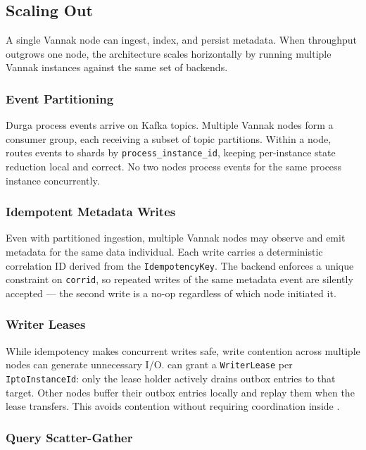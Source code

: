 \subsection{Scaling Out}

A single Vannak node can ingest, index, and persist metadata. When throughput
outgrows one node, the architecture scales horizontally by running multiple
Vannak instances against the same set of \ipto{} backends.

\subsubsection{Event Partitioning}

Durga process events arrive on Kafka topics. Multiple Vannak nodes form a
consumer group, each receiving a subset of topic partitions. Within a node,
\sitas{} routes events to shards by \texttt{process\_instance\_id}, keeping
per-instance state reduction local and correct. No two nodes process events for
the same process instance concurrently.

\subsubsection{Idempotent Metadata Writes}

Even with partitioned ingestion, multiple Vannak nodes may observe and emit
metadata for the same data individual. Each write carries a deterministic
correlation ID derived from the \texttt{IdempotencyKey}. The \ipto{} backend
enforces a unique constraint on \texttt{corrid}, so repeated writes of the same
metadata event are silently accepted --- the second write is a no-op regardless
of which node initiated it.

\subsubsection{Writer Leases}

While idempotency makes concurrent writes safe, write contention across
multiple nodes can generate unnecessary I/O. \raft{} can grant a
\texttt{WriterLease} per \texttt{IptoInstanceId}: only the lease holder
actively drains outbox entries to that target. Other nodes buffer their outbox
entries locally and replay them when the lease transfers. This avoids
contention without requiring coordination inside \ipto{}.

\subsubsection{Query Scatter-Gather}

